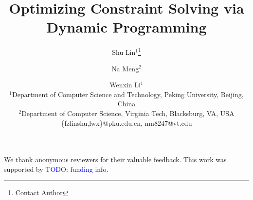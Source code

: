\documentclass{article}
\title{
Optimizing Constraint Solving via Dynamic Programming
}
\author{
Shu Lin$^1$\footnote{Contact Author}\and
Na Meng$^2$\and
Wenxin Li$^1$\\
\affiliations
$^1$Department of Computer Science and Technology, Peking University, Beijing, China\\
$^2$Department of Computer Science, Virginia Tech, Blacksburg, VA, USA\\
\emails
\{fzlinshu,lwx\}@pku.edu.cn,
nm8247@vt.edu
}
\newcommand{\todo} [1]{\textcolor{blue}{{\sf TODO}: #1}}
\begin{document}
\maketitle















We thank anonymous reviewers for their valuable feedback. This work was supported by \todo{funding info}.



\end{document}
